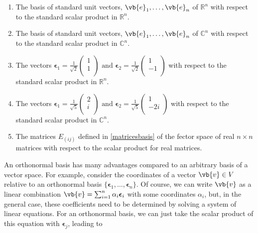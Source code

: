 \documentclass[a4paper,12pt]{report}
\begin{document}
\begin{enumerate}
    \item The basis of standard unit vectors, \(\vb{e}_1, \ldots, \vb{e}_n \) of \(\mathbb{R}^{n}\) with respect to the standard scalar product in \(\mathbb{R}^{n}\).
    \item The basis of standard unit vectors, \(\vb{e}_1, \ldots, \vb{e}_n \) of \(\mathbb{C}^{n}\) with respect to the standard scalar product in \(\mathbb{C}^{n}\).
    \item The vectors \(    \boldsymbol{\epsilon } _{1} = \frac{1}{\sqrt{2} } \begin{pmatrix}
        1 \\
        1 \\
   \end{pmatrix} \text { and } \boldsymbol{\epsilon } _{2} = \frac{1}{\sqrt{2} } \begin{pmatrix}
        1 \\
        -1 \\
   \end{pmatrix}  \) with respect to the standard scalar product in \(\mathbb{R}^{n} \). 
   \item The vectors \(    \boldsymbol{\epsilon }_{1} = \frac{1}{\sqrt{5} } \begin{pmatrix}
    2 \\
    i \\
\end{pmatrix} \text { and } \boldsymbol{\epsilon }_{2}= \frac{1}{\sqrt{5} } \begin{pmatrix}
    1 \\
    -2i \\
\end{pmatrix}   \) with respect to the standard scalar product in \(\mathbb{C}^{n} \). 
\item The matrices \(E_{(ij)} \) defined in \cref{matricesbasis} of the fector space of real \(n \times  n\) matrices with respect to the scalar product for real matrices.  
\end{enumerate}

An orthonormal basis has many advantages compared to an arbitrary basis of a vector space. For example, consider the coordinates of a vector \(\vb{v} \in V\) relative to an orthonormal basis \(\{\boldsymbol{\epsilon}_1, \hdots, \boldsymbol{\epsilon}_n\}\). Of course, we can write \(\vb{v}\) as a linear combination \(\vb{v} = \sum_{i=1}^n \alpha_i \boldsymbol{\epsilon}_i\) with some coordinates \(\alpha_i\), but, in the general case, these coefficients need to be determined by solving a system of linear equations. For an orthonormal basis, we can just take the scalar product of this equation with \(\boldsymbol{\epsilon}_j\), leading to
\end{document}
